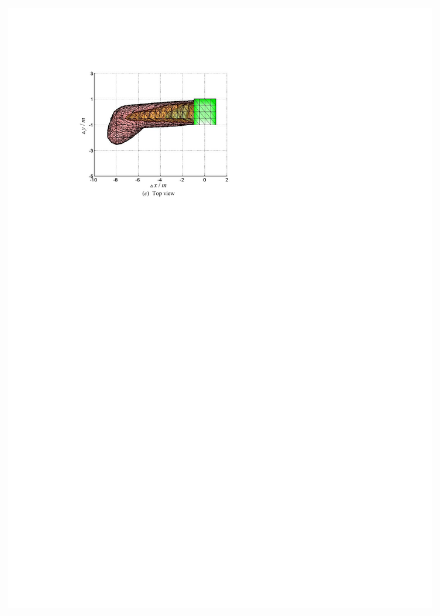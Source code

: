 \begin{figure}[h]
\begin{minipage}{0.45\linewidth}
		\includegraphics[width=0.9\linewidth]{Figures/Figs_Ch13/Fig7_3}
	\end{minipage}\qquad
	\begin{minipage}{0.45\linewidth}
		\centering

\end{minipage}
\end{figure}
